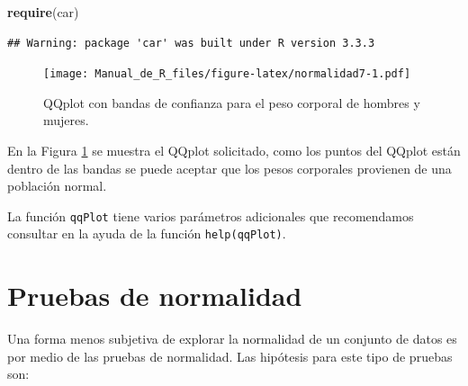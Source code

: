 \documentclass[10pt,]{krantz}
\makeatletter
\newenvironment{Shaded}{\begin{snugshade}}{\end{snugshade}}
\newcommand{\KeywordTok}[1]{\textcolor[rgb]{0.13,0.29,0.53}{\textbf{{#1}}}}
\newcommand{\DataTypeTok}[1]{\textcolor[rgb]{0.13,0.29,0.53}{{#1}}}
\newcommand{\DecValTok}[1]{\textcolor[rgb]{0.00,0.00,0.81}{{#1}}}
\newcommand{\StringTok}[1]{\textcolor[rgb]{0.31,0.60,0.02}{{#1}}}
\newcommand{\NormalTok}[1]{{#1}}
\newenvironment{kframe}{%
\medskip{}
\setlength{\fboxsep}{.8em}
 \def\at@end@of@kframe{}%
 \ifinner\ifhmode%
  \def\at@end@of@kframe{\end{minipage}}%
  \begin{minipage}{\columnwidth}%
 \fi\fi%
 \def\FrameCommand##1{\hskip\@totalleftmargin \hskip-\fboxsep
 \colorbox{shadecolor}{##1}\hskip-\fboxsep
     \hskip-\linewidth \hskip-\@totalleftmargin \hskip\columnwidth}%
 \MakeFramed {\advance\hsize-\width
   \@totalleftmargin\z@ \linewidth\hsize
   \@setminipage}}%
 {\par\unskip\endMakeFramed%
 \at@end@of@kframe}
\renewenvironment{Shaded}{\begin{kframe}}{\end{kframe}}
\makeatother
\begin{document}
\begin{Shaded}
\begin{Highlighting}[]
\KeywordTok{require}\NormalTok{(car)}
\end{Highlighting}
\end{Shaded}

\begin{verbatim}
## Warning: package 'car' was built under R version 3.3.3
\end{verbatim}

\begin{Shaded}
\end{Shaded}

\begin{figure}[htbp]
\centering
\texttt{[image: Manual\_de\_R\_files/figure-latex/normalidad7-1.pdf]}
\caption{\label{fig:normalidad7}QQplot con bandas de confianza para el peso
corporal de hombres y mujeres.}
\end{figure}

En la Figura \ref{fig:normalidad7} se muestra el QQplot solicitado, como
los puntos del QQplot están dentro de las bandas se puede aceptar que
los pesos corporales provienen de una población normal.

La función \texttt{qqPlot} tiene varios parámetros adicionales que
recomendamos consultar en la ayuda de la función \texttt{help(qqPlot)}.

\section{Pruebas de normalidad}\label{pruebas-de-normalidad}

Una forma menos subjetiva de explorar la normalidad de un conjunto de
datos es por medio de las pruebas de normalidad. Las hipótesis para este
tipo de pruebas son:
\end{document}
